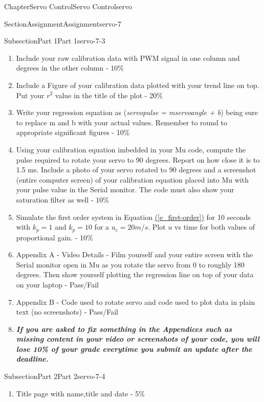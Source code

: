 \documentclass[oneside,10pt,]{book}
\newcommand{\xreffont}{\relax}
\newcommand{\linkhilite}[1]{\underline{#1}}
\newcommand{\alert}[1]{\textbf{\textit{#1}}}
\numberwithin{equation}{section}
\begin{document}
\begin{chapterptx}{Chapter}{Servo Control}{}{Servo Control}{}{}{servo}
\begin{sectionptx}{Section}{Assignment}{}{Assignment}{}{}{servo-7}
\begin{subsectionptx}{Subsection}{Part 1}{}{Part 1}{}{}{servo-7-3}
\begin{enumerate}
\item{}Include your raw calibration data with PWM signal in one column and degrees in the other column - 10\%%
\item{}Include a Figure of your calibration data plotted with your trend line on top. Put your \(r^2\) value in the title of the plot - 20\%%
\item{}Write your regression equation as (\emph{servo\textunderscore{}pulse = m\textasteriskcentered{}servo\textunderscore{}angle + b}) being sure to replace m and b with your actual values. Remember to round to appropriate significant figures - 10\%%
\item{}Using your calibration equation imbedded in your Mu code, compute the pulse required to rotate your servo to 90 degrees. Report on how close it is to 1.5 ms. Include a photo of your servo rotated to 90 degrees and a screenshot (entire computer screen) of your calibration equation placed into Mu with your pulse value in the Serial monitor. The code must also show your saturation filter as well - 10\%%
\item{}Simulate the first order system in Equation \hyperref[e_first-order]{\linkhilite{({\xreffont\ref{e_first-order}})}} for 10 seconds with \(k_p=1\) and \(k_p=10\) for a \(u_c=20 m/s\). Plot \(u\) vs time for both values of proportional gain. - 10\%%
\item{}Appendix A - Video Details - Film yourself and your entire screen with the Serial monitor open in Mu as you rotate the servo from 0 to roughly 180 degrees. Then show yourself plotting the regression line on top of your data on your laptop - Pass\slash{}Fail%
\item{}Appendix B - Code used to rotate servo and code used to plot data in plain text (no screenshots) - Pass\slash{}Fail%
\item{}\alert{If you are asked to fix something in the Appendices such as missing content in your video or screenshots of your code, you will lose 10\% of your grade everytime you submit an update after the deadline.}%
\end{enumerate}
\end{subsectionptx}
%
%
\typeout{************************************************}
\typeout{************************************************}
%
\begin{subsectionptx}{Subsection}{Part 2}{}{Part 2}{}{}{servo-7-4}
%
\begin{enumerate}
\item{}Title page with name,title and date - 5\%%

\end{enumerate}
\end{subsectionptx}
\end{sectionptx}
\end{chapterptx}
\end{document}
